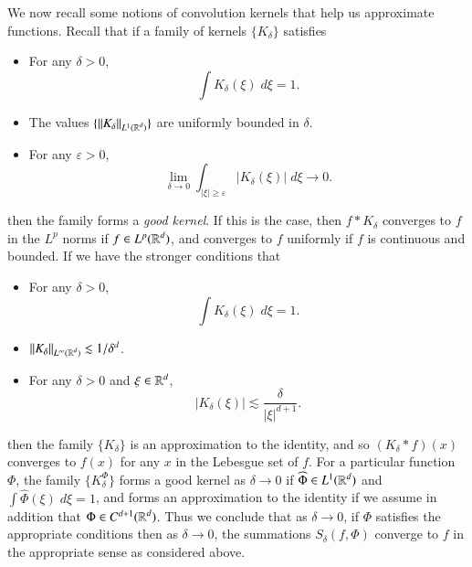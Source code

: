 We now recall some notions of convolution kernels that help us approximate functions. Recall that if a family of kernels $\{ K_\delta \}$ satisfies
%
\begin{itemize}
    \item For any $\delta > 0$,
    \[ \int K_\delta(\xi)\; d\xi = 1. \]

    \item The values $\{ \| K_\delta \|_{L^1(\operatorname{\mathbb{R}}^d)} \}$ are uniformly bounded in $\delta$.

    \item For any $\varepsilon > 0$,
    \[ \lim_{\delta \to 0} \int_{|\xi| \geq \varepsilon} |K_\delta(\xi)|\; d\xi \to 0. \]
\end{itemize}
%
then the family forms a \emph{good kernel}. If this is the case, then $f * K_\delta$ converges to $f$ in the $L^p$ norms if $f \in L^p(\operatorname{\mathbb{R}}^d)$, and converges to $f$ uniformly if $f$ is continuous and bounded. If we have the stronger conditions that
%
\begin{itemize}
    \item For any $\delta > 0$,
    \[ \int K_\delta(\xi)\; d\xi = 1. \]

    \item $\| K_\delta \|_{L^\infty(\operatorname{\mathbb{R}}^d)} \lesssim 1/\delta^d$.
    \item For any $\delta > 0$ and $\xi \in \operatorname{\mathbb{R}}^d$,
    \[ |K_\delta(\xi)| \lesssim \frac{\delta}{|\xi|^{d+1}}. \]
\end{itemize}
%
then the family $\{ K_\delta \}$ is an approximation to the identity, and so $(K_\delta * f)(x)$ converges to $f(x)$ for any $x$ in the Lebesgue set of $f$. For a particular function $\Phi$, the family $\{ K_\delta^\Phi \}$ forms a good kernel as $\delta \to 0$ if $\widehat{\Phi} \in L^1(\operatorname{\mathbb{R}}^d)$ and $\int \widehat{\Phi}(\xi)\; d\xi = 1$, and forms an approximation to the identity if we assume in addition that $\Phi \in C^{d+1}(\operatorname{\mathbb{R}}^d)$. Thus we conclude that as $\delta \to 0$, if $\Phi$ satisfies the appropriate conditions then as $\delta \to 0$, the summations $S_\delta(f,\Phi)$ converge to $f$ in the appropriate sense as considered above.

